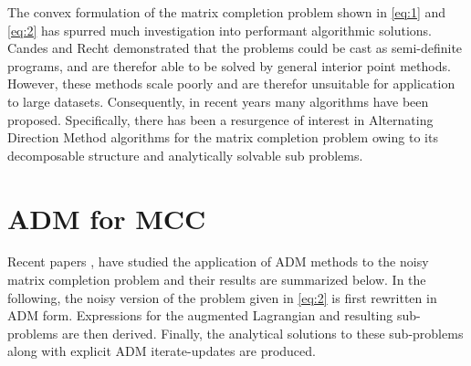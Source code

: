 \documentclass{article}
\begin{document}
The convex formulation of the matrix completion problem shown in \ref{eq:1} and \ref{eq:2} has spurred much investigation into performant algorithmic solutions.  Candes and Recht demonstrated that the problems could be cast as semi-definite programs, and are therefor able to be solved by general interior point methods.  However, these methods scale poorly and are therefor unsuitable for application to large datasets.  Consequently, in recent years many algorithms have been proposed.  Specifically, there has been a resurgence of interest in Alternating Direction Method algorithms for the matrix completion problem owing to its decomposable structure and analytically solvable sub problems.

\section{ADM for MCC} \label{ADM for Matrix Completion}

Recent papers \cite{Tao}, \cite{Yang} have studied the application of ADM methods to the noisy matrix completion problem and their results are summarized below.  In the following, the noisy version of the problem given in \ref{eq:2} is first rewritten in ADM form.  Expressions for the augmented Lagrangian and resulting sub-problems are then derived.  Finally, the analytical solutions to these sub-problems along with explicit ADM iterate-updates are produced.
\end{document}
